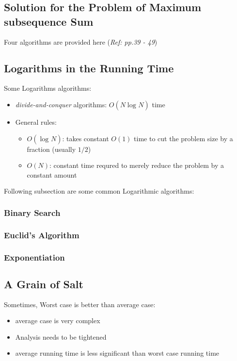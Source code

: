 \documentclass[12pt]{article}
\theoremstyle{definition}
\begin{document}
\subsection{Solution for the Problem of Maximum subsequence Sum}
Four algorithms are provided here (\emph{Ref: pp.39 - 49})

\subsection{Logarithms in the Running Time}
Some Logarithms algorithms:
\begin{itemize}
    \item \emph{divide-and-conquer} algorithms: $O(N\log_{}N)$ time 
    \item General rules:
    \begin{itemize}
        \item $O(\log_{}N)$: takes constant $O(1)$ time to cut the problem size by a fraction (usually $1/2$)
        \item $O(N)$: constant time requred to merely reduce the problem by a constant amount
    \end{itemize}
\end{itemize}

Following subsection are some common Logarithmic algorithms:

\subsubsection{Binary Search}

\subsubsection{Euclid's Algorithm}

\subsubsection{Exponentiation}

\subsection{A Grain of Salt}
Sometimes, Worst case is better than average case:
\begin{itemize}
    \item average case is very complex
    \item Analysis needs to be tightened
    \item average running time is less significant than worst case running time
\end{itemize}
\end{document}
